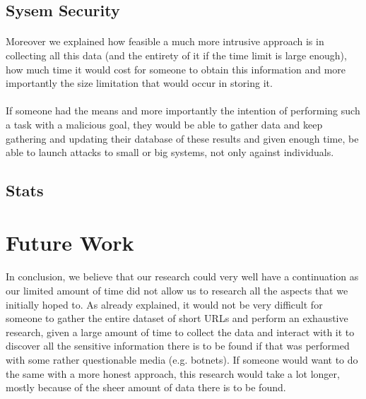 \documentclass[12pt]{article}
\begin{document}
\subsection{Sysem Security}

\paragraph{}
Moreover we explained how feasible a much more intrusive approach is in collecting all this data (and the entirety of it if the time limit is large enough), how much time it would cost for someone to obtain this information and more importantly the size limitation that would occur in storing it.

\paragraph{}
If someone had the means and more importantly the intention of performing such a task with a malicious goal, they would be able to gather data and keep gathering and updating their database of these results and given enough time, be able to launch attacks to small or big systems, not only against individuals.

\subsection{Stats}

\section{Future Work}

\paragraph{}
In conclusion, we believe that our research could very well have a continuation as our limited amount of time did not allow us to research all the aspects that we initially hoped to. As already explained, it would not be very difficult for someone to gather the entire dataset of short URLs and perform an exhaustive research, given a large amount of time to collect the data and interact with it to discover all the sensitive information there is to be found if that was performed with some rather questionable media (e.g. botnets). If someone would want to do the same with a more honest approach, this research would take a lot longer, mostly because of the sheer amount of data there is to be found.
\end{document}
